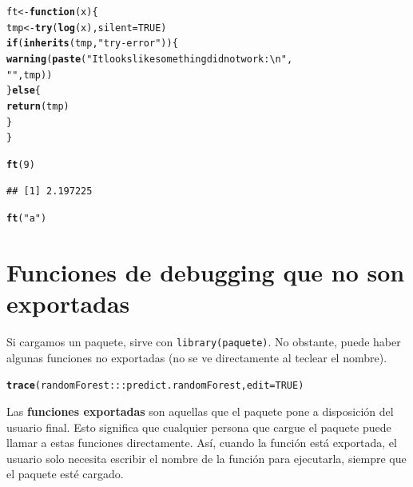 \documentclass{config/apuntes}\usepackage[]{graphicx}\usepackage[]{xcolor}
\makeatletter
\newcommand{\hlnum}[1]{\textcolor[rgb]{0.686,0.059,0.569}{#1}}%
\newcommand{\hlsng}[1]{\textcolor[rgb]{0.192,0.494,0.8}{#1}}%
\newcommand{\hlopt}[1]{\textcolor[rgb]{0,0,0}{#1}}%
\newcommand{\hldef}[1]{\textcolor[rgb]{0.345,0.345,0.345}{#1}}%
\newcommand{\hlkwa}[1]{\textcolor[rgb]{0.161,0.373,0.58}{\textbf{#1}}}%
\newcommand{\hlkwb}[1]{\textcolor[rgb]{0.69,0.353,0.396}{#1}}%
\newcommand{\hlkwc}[1]{\textcolor[rgb]{0.333,0.667,0.333}{#1}}%
\newcommand{\hlkwd}[1]{\textcolor[rgb]{0.737,0.353,0.396}{\textbf{#1}}}%
\newenvironment{kframe}{%
 \def\at@end@of@kframe{}%
 \ifinner\ifhmode%
  \def\at@end@of@kframe{\end{minipage}}%
  \begin{minipage}{\columnwidth}%
 \fi\fi%
 \def\FrameCommand##1{\hskip\@totalleftmargin \hskip-\fboxsep
 \colorbox{shadecolor}{##1}\hskip-\fboxsep
     \hskip-\linewidth \hskip-\@totalleftmargin \hskip\columnwidth}%
 \MakeFramed {\advance\hsize-\width
   \@totalleftmargin\z@ \linewidth\hsize
   \@setminipage}}%
 {\par\unskip\endMakeFramed%
 \at@end@of@kframe}
\newenvironment{knitrout}{}{} %
\newcommand{\code}[1]{\texttt{#1}}
\makeatother
\begin{document}
\begin{knitrout}
\color{fgcolor}\begin{kframe}
\begin{alltt}
\hldef{ft} \hlkwb{<-} \hlkwa{function}\hldef{(}\hlkwc{x}\hldef{) \{}
    \hldef{tmp} \hlkwb{<-} \hlkwd{try}\hldef{(}\hlkwd{log}\hldef{(x),} \hlkwc{silent} \hldef{=} \hlnum{TRUE}\hldef{)}
    \hlkwa{if}\hldef{(}\hlkwd{inherits}\hldef{(tmp,} \hlsng{"try-error"}\hldef{)) \{}
        \hlkwd{warning}\hldef{(}\hlkwd{paste}\hldef{(}\hlsng{"It looks like something did not work:\textbackslash{}n"}\hldef{,}
                      \hlsng{"   "}\hldef{, tmp))}
    \hldef{\}} \hlkwa{else}\hldef{\{}
        \hlkwd{return}\hldef{(tmp)}
    \hldef{\}}
\hldef{\}}

\hlkwd{ft}\hldef{(}\hlnum{9}\hldef{)}
\end{alltt}
\begin{verbatim}
## [1] 2.197225
\end{verbatim}
\begin{alltt}
\hlkwd{ft}\hldef{(}\hlsng{"a"}\hldef{)}
\end{alltt}


{\ttfamily\noindent{}}\end{kframe}
\end{knitrout}

\section{Funciones de debugging que no son exportadas}
Si cargamos un paquete, sirve con \code{library(paquete)}. No obstante, puede haber algunas funciones no exportadas (no se ve directamente al teclear el nombre).

\begin{knitrout}
\color{fgcolor}\begin{kframe}
\begin{alltt}
\hlkwd{trace}\hldef{(randomForest}\hlopt{:::}\hldef{predict.randomForest,} \hlkwc{edit} \hldef{=} \hlnum{TRUE}\hldef{)}
\end{alltt}
\end{kframe}
\end{knitrout}

Las \textbf{funciones exportadas} son aquellas que el paquete pone a disposición del usuario final. Esto significa que cualquier persona que cargue el paquete puede llamar a estas funciones directamente. Así, cuando la función está exportada, el usuario solo necesita escribir el nombre de la función para ejecutarla, siempre que el paquete esté cargado.
\end{document}
